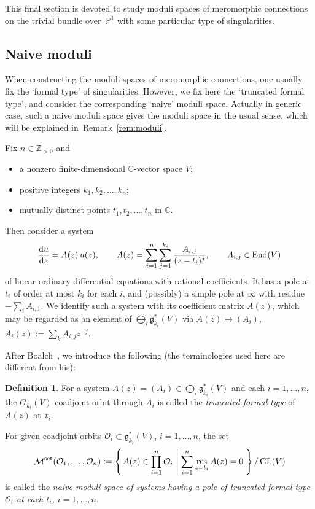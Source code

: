 \documentclass[pdftex]{sigma}
\newenvironment{itm}%
{\begin{itemize}
\setlength{\itemsep}{0em}
}%
{\end{itemize}}
\numberwithin{equation}{section}
\theoremstyle{definition}
\newtheorem{Definition}[Theorem]{Definition}
\newcommand{\remref}[1]{Remark~\ref{#1}}
\newcommand{\Z}{\mathbb{Z}} %
\newcommand{\C}{\mathbb{C}} %
\newcommand{\bbP}{\mathbb{P}} %
\newcommand{\GL}{\operatorname{GL}} %
\newcommand{\g}{\mathfrak{g}} %
\newcommand{\End}{\operatorname{End}}
\newcommand{\rset}[2]%
{\left\{ \, #1 \, \left| \hspace{0.25em} #2\right. \, \right\} }
\newcommand{\res}{\operatorname*{res}}
\newcommand{\Mset}{\operatorname{\mathcal{M}}^\mathrm{set}}
\newcommand{\bO}{\mathcal{O}}
\newcommand{\rd}{\mathop{\mathrm{d}\!}\mathstrut}
\begin{document}
This f\/inal section is devoted to study moduli spaces of
meromorphic connections on the trivial bundle over~$\bbP^1$
with some particular type of singularities.

\subsection{Naive moduli}\label{subsec:moduli}

When constructing the moduli spaces of meromorphic connections,
one usually f\/ix the `formal type' of singularities.
However, we f\/ix here the `truncated formal type',
and consider the corresponding `naive' moduli space.
Actually in generic case,
such a naive moduli space gives the moduli space in the usual sense,
which will be explained in~\remref{rem:moduli}.

Fix $n \in \Z_{>0}$ and
\begin{itm}
\item a nonzero f\/inite-dimensional $\C$-vector space $V$;
\item positive integers $k_1, k_2, \dots , k_n$;
\item mutually distinct points $t_1,t_2, \dots ,t_n$ in $\C$.
\end{itm}
Then consider a system
\[
\frac{\rd u}{\rd z} = A(z)\,u(z), \qquad
A(z)=\sum_{i=1}^n \sum_{j=1}^{k_i} \frac{A_{i,j}}{(z-t_i)^j},\qquad
A_{i,j} \in \End(V)
\]
of linear ordinary dif\/ferential equations with rational coef\/f\/icients.
It has a pole at $t_i$ of order at most $k_i$ for each $i$,
and (possibly) a simple pole at $\infty$ with residue $-\sum_i A_{i,1}$.
We identify such a system
with its coef\/f\/icient matrix $A(z)$,
which may be regarded as an element of $\bigoplus_i \g^*_{k_i}(V)$
via $A(z) \mapsto (A_i)$, $A_i(z) :=\sum_k A_{i,j}z^{-j}$.

After Boalch~\cite{MR1864833}, we introduce the following
(the terminologies used here are dif\/ferent from his):
\begin{Definition}
For a system $A(z)=(A_i) \in \bigoplus_i \g^*_{k_i}(V)$
and each $i=1, \dots ,n$,
the $G_{k_i}(V)$-coadjoint orbit through $A_i$
is called the {\em truncated formal type} of~$A(z)$ at~$t_i$.

For given coadjoint orbits
$\bO_i \subset \g^*_{k_i}(V)$, $i=1, \dots ,n$, the set
\[
\Mset(\bO_1, \dots ,\bO_n) :=
\rset{A(z) \in \prod_{i=1}^n \bO_i}%
{\sum_{i=1}^n \res_{z=t_i}A(z)=0}/\GL(V)
\]
is called the {\em naive moduli space of systems
having a pole
of truncated formal type $\bO_i$ at each $t_i$, $i=1,\dots ,n$}.
\end{Definition}
\end{document}
